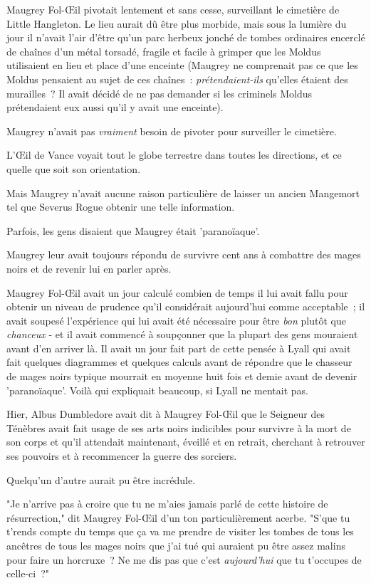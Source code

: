 Maugrey Fol-Œil pivotait lentement et sans cesse, surveillant le cimetière de Little Hangleton. Le lieu aurait dû être plus morbide, mais sous la lumière du jour il n'avait l'air d'être qu'un parc herbeux jonché de tombes ordinaires encerclé de chaînes d'un métal torsadé, fragile et facile à grimper que les Moldus utilisaient en lieu et place d'une enceinte (Maugrey ne comprenait pas ce que les Moldus pensaient au sujet de ces chaînes~: \emph{prétendaient-ils} qu'elles étaient des murailles~? Il avait décidé de ne pas demander si les criminels Moldus prétendaient eux aussi qu'il y avait une enceinte).

Maugrey n'avait pas \emph{vraiment} besoin de pivoter pour surveiller le cimetière.

L'Œil de Vance voyait tout le globe terrestre dans toutes les directions, et ce quelle que soit son orientation.

Mais Maugrey n'avait aucune raison particulière de laisser un ancien Mangemort tel que Severus Rogue obtenir une telle information.

Parfois, les gens disaient que Maugrey était 'paranoïaque'.

Maugrey leur avait toujours répondu de survivre cent ans à combattre des mages noirs et de revenir lui en parler après.

Maugrey Fol-Œil avait un jour calculé combien de temps il lui avait fallu pour obtenir un niveau de prudence qu'il considérait aujourd'hui comme acceptable~; il avait soupesé l'expérience qui lui avait été nécessaire pour être \emph{bon} plutôt que \emph{chanceux} - et il avait commencé à soupçonner que la plupart des gens mouraient avant d'en arriver là. Il avait un jour fait part de cette pensée à Lyall qui avait fait quelques diagrammes et quelques calculs avant de répondre que le chasseur de mages noirs typique mourrait en moyenne huit fois et demie avant de devenir 'paranoïaque'. Voilà qui expliquait beaucoup, si Lyall ne mentait pas.

Hier, Albus Dumbledore avait dit à Maugrey Fol-Œil que le Seigneur des Ténèbres avait fait usage de ses arts noirs indicibles pour survivre à la mort de son corps et qu'il attendait maintenant, éveillé et en retrait, cherchant à retrouver ses pouvoirs et à recommencer la guerre des sorciers.

Quelqu'un d'autre aurait pu être incrédule.

"Je n'arrive pas à croire que tu ne m'aies jamais parlé de cette histoire de résurrection," dit Maugrey Fol-Œil d'un ton particulièrement acerbe. "S'que tu t'rends compte du temps que ça va me prendre de visiter les tombes de tous les ancêtres de tous les mages noirs que j'ai tué qui auraient pu être assez malins pour faire un horcruxe~? Ne me dis pas que c'est \emph{aujourd'hui} que tu t'occupes de celle-ci~?"


